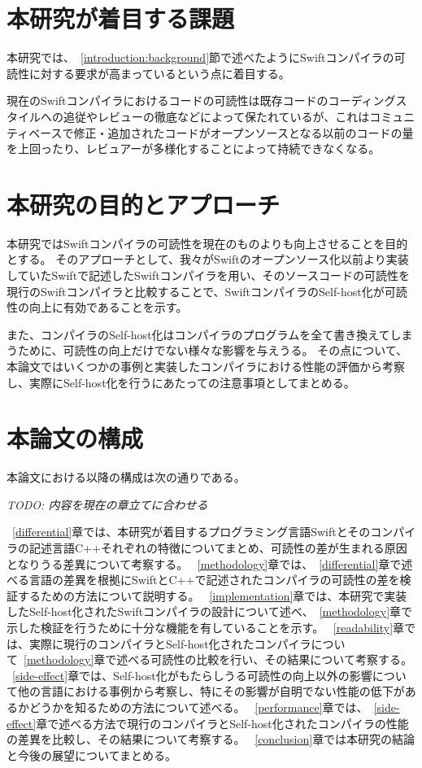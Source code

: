 \section{本研究が着目する課題}
\label{introduction:issue}

本研究では、~\ref{introduction:background}節で述べたようにSwiftコンパイラの可読性に対する要求が高まっているという点に着目する。

現在のSwiftコンパイラにおけるコードの可読性は既存コードのコーディングスタイルへの追従やレビューの徹底などによって保たれているが、これはコミュニティベースで修正・追加されたコードがオープンソースとなる以前のコードの量を上回ったり、レビュアーが多様化することによって持続できなくなる。


\section{本研究の目的とアプローチ}
\label{introduction:purpose}

本研究ではSwiftコンパイラの可読性を現在のものよりも向上させることを目的とする。
そのアプローチとして、我々がSwiftのオープンソース化以前より実装していたSwiftで記述したSwiftコンパイラを用い、そのソースコードの可読性を現行のSwiftコンパイラと比較することで、SwiftコンパイラのSelf-host化が可読性の向上に有効であることを示す。

また、コンパイラのSelf-host化はコンパイラのプログラムを全て書き換えてしまうために、可読性の向上だけでない様々な影響を与えうる。
その点について、本論文ではいくつかの事例と実装したコンパイラにおける性能の評価から考察し、実際にSelf-host化を行うにあたっての注意事項としてまとめる。


\section{本論文の構成}

本論文における以降の構成は次の通りである。

\vspace{2em}
{\sl\small{TODO: 内容を現在の章立てに合わせる}}
\vspace{1em}

~\ref{differential}章では、本研究が着目するプログラミング言語Swiftとそのコンパイラの記述言語C++それぞれの特徴についてまとめ、可読性の差が生まれる原因となりうる差異について考察する。
~\ref{methodology}章では、~\ref{differential}章で述べる言語の差異を根拠にSwiftとC++で記述されたコンパイラの可読性の差を検証するための方法について説明する。
~\ref{implementation}章では、本研究で実装したSelf-host化されたSwiftコンパイラの設計について述べ、~\ref{methodology}章で示した検証を行うために十分な機能を有していることを示す。
~\ref{readability}章では、実際に現行のコンパイラとSelf-host化されたコンパイラについて~\ref{methodology}章で述べる可読性の比較を行い、その結果について考察する。
~\ref{side-effect}章では、Self-host化がもたらしうる可読性の向上以外の影響について他の言語における事例から考察し、特にその影響が自明でない性能の低下があるかどうかを知るための方法について述べる。
~\ref{performance}章では、~\ref{side-effect}章で述べる方法で現行のコンパイラとSelf-host化されたコンパイラの性能の差異を比較し、その結果について考察する。
~\ref{conclusion}章では本研究の結論と今後の展望についてまとめる。

